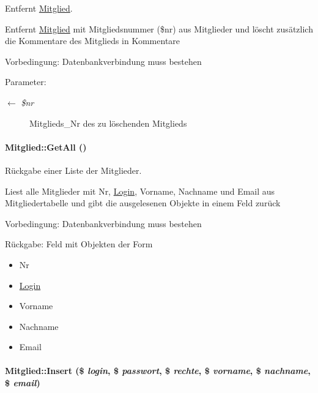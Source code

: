 Entfernt \hyperlink{classMitglied}{Mitglied}. 

Entfernt \hyperlink{classMitglied}{Mitglied} mit Mitgliedsnummer (\$nr) aus Mitglieder und löscht zusätzlich die Kommentare des Mitglieds in Kommentare \begin{Desc}
\item[Vorbedingung:]Datenbankverbindung muss bestehen \end{Desc}
\begin{Desc}
\item[Parameter:]
\begin{description}
\item[\mbox{$\leftarrow$} {\em \$nr}]Mitglieds\_\-Nr des zu löschenden Mitglieds\end{description}
\end{Desc}
\hypertarget{classMitglied_70ce63c9c9a7159966dc9e80a7f726a2}{
\paragraph[GetAll]{\setlength{\rightskip}{0pt plus 5cm}Mitglied::Get\-All ()}\hfill}
\label{classMitglied_70ce63c9c9a7159966dc9e80a7f726a2}


Rückgabe einer Liste der Mitglieder. 

Liest alle Mitglieder mit Nr, \hyperlink{classLogin}{Login}, Vorname, Nachname und Email aus Mitgliedertabelle und gibt die ausgelesenen Objekte in einem Feld zurück \begin{Desc}
\item[Vorbedingung:]Datenbankverbindung muss bestehen \end{Desc}
\begin{Desc}
\item[R\"{u}ckgabe:]Feld mit Objekten der Form\begin{itemize}
\item Nr\item \hyperlink{classLogin}{Login}\item Vorname\item Nachname\item Email\end{itemize}
\end{Desc}
\hypertarget{classMitglied_a856527798258505adf9eb08b79fd9fc}{
\paragraph[Insert]{\setlength{\rightskip}{0pt plus 5cm}Mitglied::Insert (\$ {\em login}, \$ {\em passwort}, \$ {\em rechte}, \$ {\em vorname}, \$ {\em nachname}, \$ {\em email})}\hfill}
\label{classMitglied_a856527798258505adf9eb08b79fd9fc}


